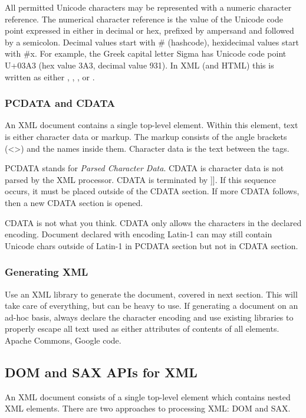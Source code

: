 All permitted Unicode characters may be represented with a numeric character reference.
The numerical character reference is the value of the Unicode code point
expressed in either in decimal or hex, 
prefixed by ampersand and followed by a semicolon.
Decimal values start with \# (hashcode), hexidecimal values start with \#x.
For example, the Greek capital letter Sigma has Unicode code point U+03A3
(hex value 3A3, decimal value 931).  In XML (and HTML) this is written as either
, , ,  or .

\subsubsection{PCDATA and CDATA}

An XML document contains a single top-level element.
Within this element, text is either character data or markup.
The markup consists of the angle brackets (<>) and the names inside them.
Character data is the text between the tags.

PCDATA stands for \emph{Parsed Character Data}.
CDATA is character data is not parsed by the XML processor.
CDATA is terminated by ]].  If this sequence occurs, it must be placed outside of
the CDATA section.  If more CDATA follows, then a new CDATA section is opened.

CDATA is not what you think.  CDATA only allows the characters in the declared encoding.
Document declared with encoding Latin-1 can may still contain Unicode chars outside of Latin-1
in PCDATA section but not in CDATA section.


\subsubsection{Generating XML}

Use an XML library to generate the document, covered in next section.
This will take care of everything, but can be heavy to use.
If generating a document on an ad-hoc basis, always declare
the character encoding and use existing libraries to properly
escape all text used as either attributes of contents of all elements.
Apache Commons, Google code.


\subsection{DOM and SAX APIs for XML}\label{xml-dom-sax}

An XML document consists of a single top-level element which contains
nested XML elements.   There are two approaches to processing XML:
DOM and SAX.

